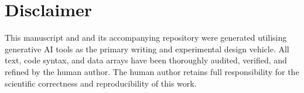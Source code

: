 \documentclass[11pt]{article}
\begin{document}
	\section*{Disclaimer}

	This manuscript and and its accompanying repository were generated utilising generative AI tools as the primary writing and experimental design vehicle. All text, code syntax, and data arrays have been thoroughly audited, verified, and refined by the human author. The human author retains full responsibility for the scientific correctness and reproducibility of this work.

	
	
	
\end{document}
